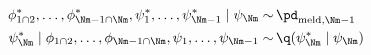 \begin{align}
  \phi_{1 \cap 2}^{*}, \ldots, \phi_{\Nm - 1 \cap \Nm}^{*}, \psi_{1}^{*}, \ldots, \psi_{\Nm - 1}^{*} \mid \psi_{\Nm} 
    \sim & \, 
    \pd_{\text{meld}, \Nm - 1}
  \\
  \psi_{\Nm}^{*} \mid \phi_{1 \cap 2}, \ldots, \phi_{\Nm - 1 \cap \Nm}, \psi_{1}, \ldots, \psi_{\Nm - 1}
    \sim & \,
    \q(\psi_{\Nm}^{*} \mid \psi_{\Nm})
  \label{eqn:stage-M-gibbs-updates}
\end{align}